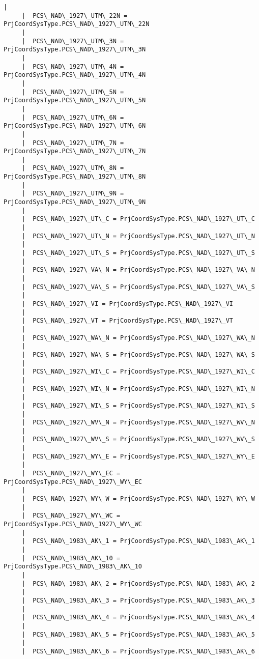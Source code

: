 \documentclass[11pt]{article}
\begin{document}
\begin{Verbatim}[commandchars=\\\{\}]
     |  
     |  PCS\_NAD\_1927\_UTM\_22N = PrjCoordSysType.PCS\_NAD\_1927\_UTM\_22N
     |  
     |  PCS\_NAD\_1927\_UTM\_3N = PrjCoordSysType.PCS\_NAD\_1927\_UTM\_3N
     |  
     |  PCS\_NAD\_1927\_UTM\_4N = PrjCoordSysType.PCS\_NAD\_1927\_UTM\_4N
     |  
     |  PCS\_NAD\_1927\_UTM\_5N = PrjCoordSysType.PCS\_NAD\_1927\_UTM\_5N
     |  
     |  PCS\_NAD\_1927\_UTM\_6N = PrjCoordSysType.PCS\_NAD\_1927\_UTM\_6N
     |  
     |  PCS\_NAD\_1927\_UTM\_7N = PrjCoordSysType.PCS\_NAD\_1927\_UTM\_7N
     |  
     |  PCS\_NAD\_1927\_UTM\_8N = PrjCoordSysType.PCS\_NAD\_1927\_UTM\_8N
     |  
     |  PCS\_NAD\_1927\_UTM\_9N = PrjCoordSysType.PCS\_NAD\_1927\_UTM\_9N
     |  
     |  PCS\_NAD\_1927\_UT\_C = PrjCoordSysType.PCS\_NAD\_1927\_UT\_C
     |  
     |  PCS\_NAD\_1927\_UT\_N = PrjCoordSysType.PCS\_NAD\_1927\_UT\_N
     |  
     |  PCS\_NAD\_1927\_UT\_S = PrjCoordSysType.PCS\_NAD\_1927\_UT\_S
     |  
     |  PCS\_NAD\_1927\_VA\_N = PrjCoordSysType.PCS\_NAD\_1927\_VA\_N
     |  
     |  PCS\_NAD\_1927\_VA\_S = PrjCoordSysType.PCS\_NAD\_1927\_VA\_S
     |  
     |  PCS\_NAD\_1927\_VI = PrjCoordSysType.PCS\_NAD\_1927\_VI
     |  
     |  PCS\_NAD\_1927\_VT = PrjCoordSysType.PCS\_NAD\_1927\_VT
     |  
     |  PCS\_NAD\_1927\_WA\_N = PrjCoordSysType.PCS\_NAD\_1927\_WA\_N
     |  
     |  PCS\_NAD\_1927\_WA\_S = PrjCoordSysType.PCS\_NAD\_1927\_WA\_S
     |  
     |  PCS\_NAD\_1927\_WI\_C = PrjCoordSysType.PCS\_NAD\_1927\_WI\_C
     |  
     |  PCS\_NAD\_1927\_WI\_N = PrjCoordSysType.PCS\_NAD\_1927\_WI\_N
     |  
     |  PCS\_NAD\_1927\_WI\_S = PrjCoordSysType.PCS\_NAD\_1927\_WI\_S
     |  
     |  PCS\_NAD\_1927\_WV\_N = PrjCoordSysType.PCS\_NAD\_1927\_WV\_N
     |  
     |  PCS\_NAD\_1927\_WV\_S = PrjCoordSysType.PCS\_NAD\_1927\_WV\_S
     |  
     |  PCS\_NAD\_1927\_WY\_E = PrjCoordSysType.PCS\_NAD\_1927\_WY\_E
     |  
     |  PCS\_NAD\_1927\_WY\_EC = PrjCoordSysType.PCS\_NAD\_1927\_WY\_EC
     |  
     |  PCS\_NAD\_1927\_WY\_W = PrjCoordSysType.PCS\_NAD\_1927\_WY\_W
     |  
     |  PCS\_NAD\_1927\_WY\_WC = PrjCoordSysType.PCS\_NAD\_1927\_WY\_WC
     |  
     |  PCS\_NAD\_1983\_AK\_1 = PrjCoordSysType.PCS\_NAD\_1983\_AK\_1
     |  
     |  PCS\_NAD\_1983\_AK\_10 = PrjCoordSysType.PCS\_NAD\_1983\_AK\_10
     |  
     |  PCS\_NAD\_1983\_AK\_2 = PrjCoordSysType.PCS\_NAD\_1983\_AK\_2
     |  
     |  PCS\_NAD\_1983\_AK\_3 = PrjCoordSysType.PCS\_NAD\_1983\_AK\_3
     |  
     |  PCS\_NAD\_1983\_AK\_4 = PrjCoordSysType.PCS\_NAD\_1983\_AK\_4
     |  
     |  PCS\_NAD\_1983\_AK\_5 = PrjCoordSysType.PCS\_NAD\_1983\_AK\_5
     |  
     |  PCS\_NAD\_1983\_AK\_6 = PrjCoordSysType.PCS\_NAD\_1983\_AK\_6

\end{Verbatim}
\end{document}
